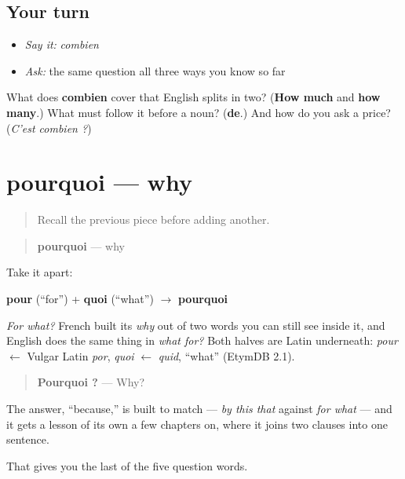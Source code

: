 \subsection*{Your turn}
\begin{itemize}
\raggedright
  \item \emph{Say it:} \emph{combien}
  \item \emph{Ask:} the same question all three ways you know so far
\end{itemize}

\begin{tcolorbox}[breakable,colback=teal!4,colframe=teal!35!black,title={Before you move on}]
What does \textbf{combien} cover that English splits in two? (\textbf{How much} and \textbf{how many}.) What must follow it before a noun? (\textbf{de}.) And how do you ask a price? (\emph{C'est combien ?})
\end{tcolorbox}
\section[pourquoi]{pourquoi — why}

\label{lesson:FR-C32-pourquoi}



\begin{quote}
Recall the previous piece before adding another.
\end{quote}

\begin{cousinweb}
\begin{quote}
\textbf{pourquoi} — why
\end{quote}

Take it apart:

\textbf{pour} (\textquotedblleft{}for\textquotedblright{}) + \textbf{quoi} (\textquotedblleft{}what\textquotedblright{}) $\to$ \textbf{pourquoi}

\emph{For what?} French built its \emph{why} out of two words you can still see inside it, and English does the same thing in \emph{what for?} Both halves are Latin underneath: \emph{pour} $\leftarrow$ Vulgar Latin \emph{por}, \emph{quoi} $\leftarrow$ \emph{quid}, \textquotedblleft{}what\textquotedblright{} (EtymDB 2.1).

\begin{quote}
\textbf{Pourquoi ?} — Why?
\end{quote}

The answer, \textquotedblleft{}because,\textquotedblright{} is built to match — \emph{by this that} against \emph{for what} — and it gets a lesson of its own a few chapters on, where it joins two clauses into one sentence.

That gives you the last of the five question words.
\end{cousinweb}

